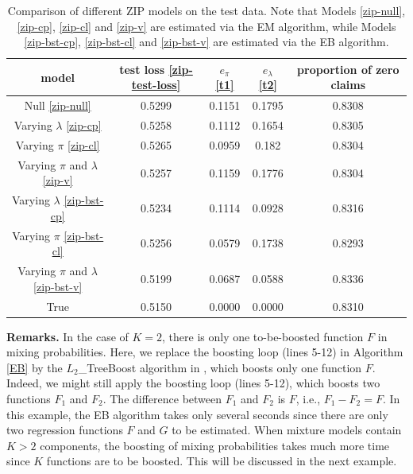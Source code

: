\documentclass[11pt]{article}
\numberwithin{equation}{section}
\begin{document}
\begin{table}[htp!]
	\caption{Comparison of different ZIP models on the test data. Note that Models \eqref{zip-null}, \eqref{zip-cp}, \eqref{zip-cl} and \eqref{zip-v} are estimated via the EM algorithm, while Models \eqref{zip-bst-cp}, \eqref{zip-bst-cl} and \eqref{zip-bst-v} are estimated via the EB algorithm.} \label{zip}
	\centering
	\begin{tabular}{ccccc}
		
		\hline\hline
		model   & test loss \eqref{zip-test-loss}  & $e_\pi$ \eqref{t1}& $e_\lambda$ \eqref{t2} & proportion of zero claims \\ \hline
		Null \eqref{zip-null}    & 0.5299 & 0.1151     & 0.1795     & 0.8308        \\
		Varying $\lambda$ \eqref{zip-cp} & 0.5258 & 0.1112     & 0.1654     & 0.8305        \\
		Varying $\pi$ \eqref{zip-cl} & 0.5265 & 0.0959     & 0.182      & 0.8304        \\
		Varying $\pi$ and $\lambda$  \eqref{zip-v} & 0.5257 & 0.1159     & 0.1776     & 0.8304        \\
		\hline
		Varying $\lambda$  \eqref{zip-bst-cp} & 0.5234 & 0.1114     & 0.0928     & 0.8316        \\
		Varying $\pi$   \eqref{zip-bst-cl} & 0.5256 & 0.0579     & 0.1738     & 0.8293        \\
		Varying $\pi$ and $\lambda$  \eqref{zip-bst-v}  & 0.5199 & 0.0687     & 0.0588     & 0.8336        \\
		\hline
		True    & 0.5150  & 0.0000         & 0.0000         & 0.8310         \\ \hline\hline
	\end{tabular}
\end{table}

{\bf Remarks.}
In the case of $K=2$, there is only one to-be-boosted function $F$ in mixing probabilities. 
Here, we replace the boosting loop (lines 5-12) in Algorithm \ref{EB} by the $L_2$\_TreeBoost algorithm in \citet{friedman2001greedy},
which boosts only one function $F$.   
Indeed, we might still apply the boosting loop (lines 5-12), which boosts two functions $F_1$ and $F_2$. The difference between $F_1$ and $F_2$ is $F$, i.e., $F_1-F_2=F.$
In this example, the EB algorithm takes only several seconds since there are only two regression functions $F$ and $G$ to be estimated.
When mixture models contain $K>2$ components, the boosting of mixing probabilities takes much more time since $K$ functions are to be boosted. This will be discussed in the next example.
\end{document}
